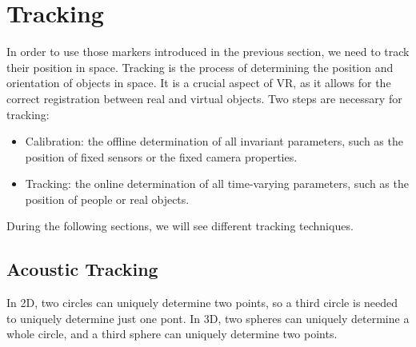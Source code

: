 \section{Tracking}

In order to use those markers introduced in the previous section, we need to track their position in space. Tracking is the process of determining the position and orientation of objects in space. It is a crucial aspect of VR, as it allows for the correct registration between real and virtual objects. Two steps are necessary for tracking:
\begin{itemize}
    \item Calibration: the offline determination of all invariant parameters, such as the position of fixed sensors or the fixed camera properties.
    \item Tracking: the online determination of all time-varying parameters, such as the position of people or real objects.
\end{itemize}

During the following sections, we will see different tracking techniques.

\subsection{Acoustic Tracking}

In 2D, two circles can uniquely
determine two points, so a third circle is needed to uniquely determine just one pont. In 3D, two spheres can uniquely determine a whole circle, and a third sphere can uniquely determine two points.\\

